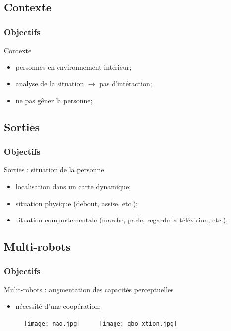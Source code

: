 \documentclass[usepdftitle=false, xcolor=dvipsnames, 12, c]{beamer}
\begin{document}
\subsection{Contexte}
\begin{frame}[label=objContexte]
\frametitle{Objectifs}
Contexte
\begin{itemize}
    \item[] personnes en environnement intérieur;
    \item[] analyse de la situation $\rightarrow$ pas d'intéraction;
    \item[] ne pas gêner la personne;
\end{itemize}
\end{frame}

\subsection{Sorties}
\begin{frame}[label=objSorties]
\frametitle{Objectifs}
Sorties : situation de la personne
    \begin{itemize}
        \item[] localisation dans un carte dynamique;
        \item[] situation physique (debout, assise, etc.);
        \item[] situation comportementale (marche, parle, regarde la télévision, etc.);
    \end{itemize}
\end{frame}

\subsection{Multi-robots}
\begin{frame}[label=objMultirobots]
\frametitle{Objectifs}
    Mulit-robots : augmentation des capacités perceptuelles
    \begin{itemize}
        \item[] nécessité d'une coopération;
    \end{itemize}
    \begin{figure}[p]
        \texttt{[image: nao.jpg]} ~~~~ \texttt{[image: qbo\_xtion.jpg]}
    \end{figure}
\end{frame}
\end{document}
